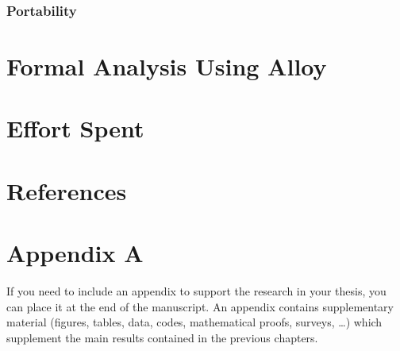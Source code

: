 \documentclass{Configuration_Files/PoliMi3i_thesis}
\begin{document}
    \subsection{Portability}\label{subsec:portability}


    \chapter{Formal Analysis Using Alloy}\label{ch:formal_analysis_using_alloy}


    \chapter{Effort Spent}\label{ch:effort_spent}


    \chapter{References}\label{ch:references}



    \cleardoublepage
    \appendix


    \chapter{Appendix A}\label{ch:appendix_a}
    If you need to include an appendix to support the research in your thesis, you can place it at the end of the manuscript.
    An appendix contains supplementary material (figures, tables, data, codes, mathematical proofs, surveys, \dots)
    which supplement the main results contained in the previous chapters.


    \listoffigures

    \listoftables

    \cleardoublepage
\end{document}
